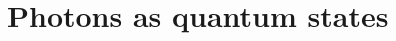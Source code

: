 \documentclass[aspectratio=169,9pt]{beamer}
\begin{document}



\section{Photons as quantum states}
\end{document}
